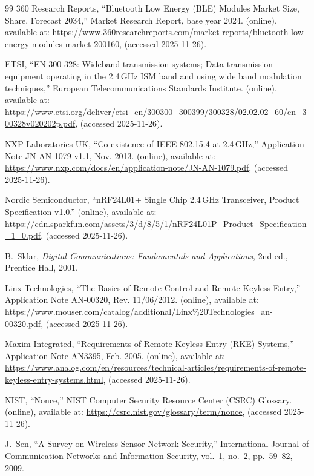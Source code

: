 \documentclass[twocolumn,10pt,a4paper]{jsarticle}
\begin{document}
\begin{thebibliography}{99}
360 Research Reports,
``Bluetooth Low Energy (BLE) Modules Market Size, Share, Forecast 2034,''
Market Research Report, base year 2024. (online),
available at: \url{https://www.360researchreports.com/market-reports/bluetooth-low-energy-modules-market-200160},
(accessed 2025-11-26).

ETSI,
``EN 300 328: Wideband transmission systems; Data transmission equipment operating in the 2.4\,GHz ISM band and using wide band modulation techniques,''
European Telecommunications Standards Institute. (online),
available at: \url{https://www.etsi.org/deliver/etsi_en/300300_300399/300328/02.02.02_60/en_300328v020202p.pdf},
(accessed 2025-11-26).

NXP Laboratories UK,
``Co-existence of IEEE 802.15.4 at 2.4\,GHz,''
Application Note JN-AN-1079 v1.1, Nov. 2013. (online),
available at: \url{https://www.nxp.com/docs/en/application-note/JN-AN-1079.pdf},
(accessed 2025-11-26).

Nordic Semiconductor,
``nRF24L01+ Single Chip 2.4\,GHz Transceiver, Product Specification v1.0.'' (online),
available at: \url{https://cdn.sparkfun.com/assets/3/d/8/5/1/nRF24L01P_Product_Specification_1_0.pdf},
(accessed 2025-11-26).

B.~Sklar,
\textit{Digital Communications: Fundamentals and Applications}, 2nd ed.,
Prentice Hall, 2001.

Linx Technologies,
``The Basics of Remote Control and Remote Keyless Entry,''
Application Note AN-00320, Rev. 11/06/2012. (online),
available at: \url{https://www.mouser.com/catalog/additional/Linx%20Technologies_an-00320.pdf},
(accessed 2025-11-26).

Maxim Integrated,
``Requirements of Remote Keyless Entry (RKE) Systems,''
Application Note AN3395, Feb. 2005. (online),
available at: \url{https://www.analog.com/en/resources/technical-articles/requirements-of-remote-keyless-entry-systems.html},
(accessed 2025-11-26).

NIST,
``Nonce,'' NIST Computer Security Resource Center (CSRC) Glossary. (online),
available at: \url{https://csrc.nist.gov/glossary/term/nonce},
(accessed 2025-11-26).

J.~Sen,
``A Survey on Wireless Sensor Network Security,''
International Journal of Communication Networks and Information Security,
vol.~1, no.~2, pp.~59--82, 2009.


\end{thebibliography}
\end{document}
